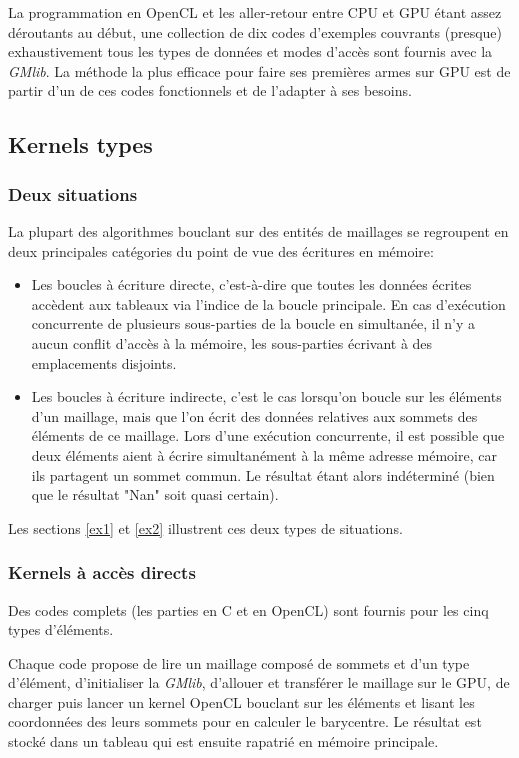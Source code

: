 \documentclass[a4paper,12pt]{article}
\begin{document}
La programmation en OpenCL et les aller-retour entre CPU et GPU étant assez déroutants au début, une collection de dix codes d'exemples couvrants (presque) exhaustivement tous les types de données et modes d'accès sont fournis avec la \emph{GMlib}. La méthode la plus efficace pour faire ses premières armes sur GPU est de partir d'un de ces codes fonctionnels et de l'adapter à ses besoins.

\subsection{Kernels types}
\subsubsection*{Deux situations}
La plupart des algorithmes bouclant sur des entités de maillages se regroupent en deux principales catégories du point de vue des écritures en mémoire:
\begin{itemize}
\item Les boucles à écriture directe, c'est-à-dire que toutes les données écrites accèdent aux tableaux via l'indice de la boucle principale. En cas d'exécution concurrente de plusieurs sous-parties de la boucle en simultanée, il n'y a aucun conflit d'accès à la mémoire, les sous-parties écrivant à des emplacements disjoints.
\item Les boucles à écriture indirecte, c'est le cas lorsqu'on boucle sur les éléments d'un maillage, mais que l'on écrit des données relatives aux sommets des éléments de ce maillage. Lors d'une exécution concurrente, il est possible que deux éléments aient à écrire simultanément à la même adresse mémoire, car ils partagent un sommet commun. Le résultat étant alors indéterminé (bien que le résultat "Nan" soit quasi certain).
\end{itemize}

Les sections \ref{ex1} et \ref{ex2} illustrent ces deux types de situations.

\subsubsection*{Kernels à accès directs}
Des codes complets (les parties en C et en OpenCL) sont fournis pour les cinq types d'éléments.

Chaque code propose de lire un maillage composé de sommets et d'un type d'élément, d'initialiser la \emph{GMlib}, d'allouer et transférer le maillage sur le GPU, de charger puis lancer un kernel OpenCL bouclant sur les éléments et lisant les coordonnées des leurs sommets pour en calculer le barycentre. Le résultat est stocké dans un tableau qui est ensuite rapatrié en mémoire principale.
\end{document}
